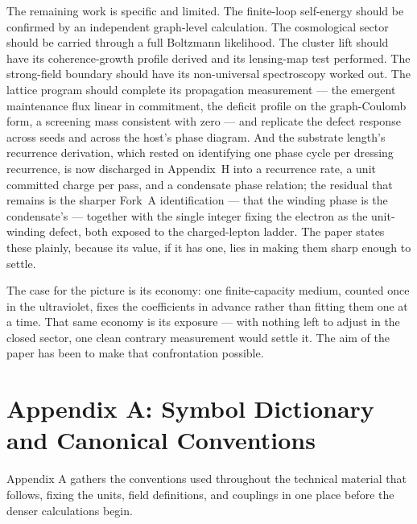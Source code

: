 \documentclass[11pt]{article}
\begin{document}
The remaining work is specific and limited. The finite-loop self-energy should be confirmed by an independent graph-level calculation. The cosmological sector should be carried through a full Boltzmann likelihood. The cluster lift should have its coherence-growth profile derived and its lensing-map test performed. The strong-field boundary should have its non-universal spectroscopy worked out. The lattice program should complete its propagation measurement --- the emergent maintenance flux linear in commitment, the deficit profile on the graph-Coulomb form, a screening mass consistent with zero --- and replicate the defect response across seeds and across the host's phase diagram. And the substrate length's recurrence derivation, which rested on identifying one phase cycle per dressing recurrence, is now discharged in Appendix~H into a recurrence rate, a unit committed charge per pass, and a condensate phase relation; the residual that remains is the sharper Fork~A identification --- that the winding phase is the condensate's --- together with the single integer fixing the electron as the unit-winding defect, both exposed to the charged-lepton ladder. The paper states these plainly, because its value, if it has one, lies in making them sharp enough to settle.

The case for the picture is its economy: one finite-capacity medium, counted once in the ultraviolet, fixes the coefficients in advance rather than fitting them one at a time. That same economy is its exposure --- with nothing left to adjust in the closed sector, one clean contrary measurement would settle it. The aim of the paper has been to make that confrontation possible.

\clearpage
\section*{Appendix A: Symbol Dictionary and Canonical Conventions}

Appendix A gathers the conventions used throughout the technical material that follows, fixing the units, field definitions, and couplings in one place before the denser calculations begin.
\end{document}
